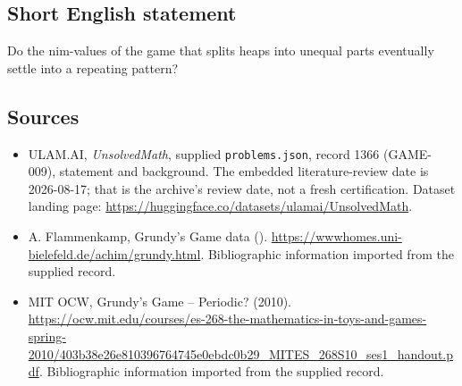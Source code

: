 \documentclass[11pt,a4paper]{article}
\begin{document}
\subsection{Short English statement}

Do the nim-values of the game that splits heaps into unequal parts eventually settle into a repeating pattern?

\subsection{Sources}

{\small

\begin{itemize}

\item[\hypertarget{source:1366:1}{S1}] ULAM.AI, \emph{UnsolvedMath}, supplied \texttt{problems.json}, record 1366 (GAME-009), statement and background. The embedded literature-review date is 2026-08-17; that is the archive’s review date, not a fresh certification. Dataset landing page: \url{https://huggingface.co/datasets/ulamai/UnsolvedMath}.

\item[\hypertarget{source:1366:2}{S2}] A. Flammenkamp, Grundy's Game data (). \url{https://wwwhomes.uni-bielefeld.de/achim/grundy.html}. Bibliographic information imported from the supplied record.

\item[\hypertarget{source:1366:3}{S3}] MIT OCW, Grundy's Game -- Periodic? (2010). \url{https://ocw.mit.edu/courses/es-268-the-mathematics-in-toys-and-games-spring-2010/403b38e26e810396764745e0ebdc0b29_MITES_268S10_ses1_handout.pdf}. Bibliographic information imported from the supplied record.

\end{itemize}

}

\label{end:1366}
\end{document}
